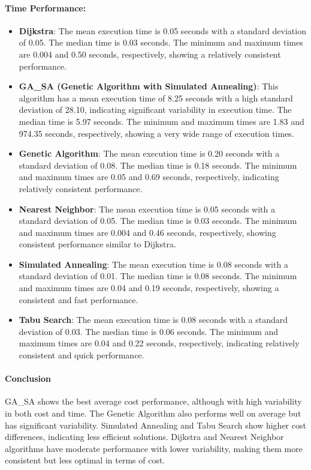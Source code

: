 \documentclass[
]{article}
\begin{document}
    \paragraph{Time Performance:}
    \begin{itemize}
        \item \textbf{Dijkstra}: The mean execution time is 0.05 seconds with a standard deviation of 0.05. The median time is 0.03 seconds. The minimum and maximum times are 0.004 and 0.50 seconds, respectively, showing a relatively consistent performance.
        \item \textbf{GA\_SA (Genetic Algorithm with Simulated Annealing)}: This algorithm has a mean execution time of 8.25 seconds with a high standard deviation of 28.10, indicating significant variability in execution time. The median time is 5.97 seconds. The minimum and maximum times are 1.83 and 974.35 seconds, respectively, showing a very wide range of execution times.
        \item \textbf{Genetic Algorithm}: The mean execution time is 0.20 seconds with a standard deviation of 0.08. The median time is 0.18 seconds. The minimum and maximum times are 0.05 and 0.69 seconds, respectively, indicating relatively consistent performance.
        \item \textbf{Nearest Neighbor}: The mean execution time is 0.05 seconds with a standard deviation of 0.05. The median time is 0.03 seconds. The minimum and maximum times are 0.004 and 0.46 seconds, respectively, showing consistent performance similar to Dijkstra.
        \item \textbf{Simulated Annealing}: The mean execution time is 0.08 seconds with a standard deviation of 0.01. The median time is 0.08 seconds. The minimum and maximum times are 0.04 and 0.19 seconds, respectively, showing a consistent and fast performance.
        \item \textbf{Tabu Search}: The mean execution time is 0.08 seconds with a standard deviation of 0.03. The median time is 0.06 seconds. The minimum and maximum times are 0.04 and 0.22 seconds, respectively, indicating relatively consistent and quick performance.
    \end{itemize}

    \paragraph{Conclusion}

    GA\_SA shows the best average cost performance, although with high variability in both cost and time.
    The Genetic Algorithm also performs well on average but has significant variability.
    Simulated Annealing and Tabu Search show higher cost differences, indicating less efficient solutions.
    Dijkstra and Nearest Neighbor algorithms have moderate performance with lower variability, making them more consistent but less optimal in terms of cost.
\end{document}
